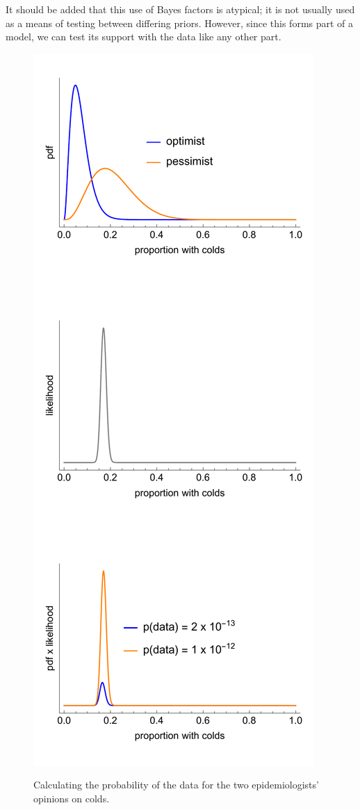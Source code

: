 \documentclass[11pt,fullpage]{book}
\begin{document}
It should be added that this use of Bayes factors is atypical; it is not usually used as a means of testing between differing priors. However, since this forms part of a model, we can test its support with the data like any other part.

\begin{figure}
\centering
\scalebox{0.45} 
{\includegraphics{Posterior_bayesFactorFluEpidemiologist.pdf}}
\caption{Calculating the probability of the data for the two epidemiologists' opinions on colds.}\label{fig:Posterior_bayesFactorFluEpidemiologist}
\end{figure}
\end{document}
